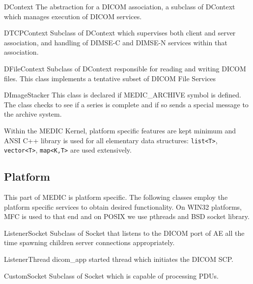 \documentclass[a4paper,10pt]{article}
\begin{document}
\begin{class}{DContext}
  The abstraction for a DICOM association, a subclass of DContext
  which manages execution of DICOM services.
\end{class}

\begin{class}{DTCPContext}
  Subclass of DContext which supervises both client and server
  association, and handling of DIMSE-C and DIMSE-N services within that
  association.
\end{class}

\begin{class}{DFileContext}
  Subclass of DContext responsible for reading and writing DICOM
  files. This class implements a tentative subset of DICOM File Services
\end{class}

\begin{class}{DImageStacker}
  This class is declared if MEDIC{\_}ARCHIVE symbol is defined.
  The class checks to see if a series is complete and if so sends a special
  message to the archive system.
\end{class}

Within the MEDIC Kernel, platform specific features are kept minimum and ANSI
C++ library is used for all elementary data structures:
\verb+list<T>+, \verb+vector<T>+, \verb+map<K,T>+ are used extensively.

\subsection{Platform}

This part of MEDIC is platform specific. The following classes employ
the platform specific services to obtain  desired functionality. On
WIN32 platforms, MFC is used to that end and on POSIX we use pthreads
and BSD socket library.

\begin{class}{ListenerSocket}
  Subclass of Socket that listens to the DICOM port of AE
  all the time spawning children server connections appropriately.
\end{class}

\begin{class}{ListenerThread}
  dicom{\_}app started thread which initiates the DICOM SCP.
\end{class}

\begin{class}{CustomSocket}
  Subclass of Socket which is capable of processing PDUs.
\end{class}
\end{document}
